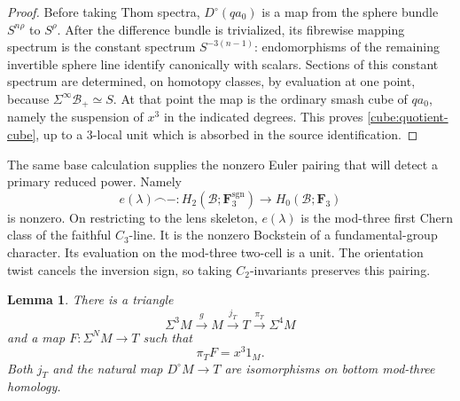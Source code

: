 \documentclass[11pt]{article}
\newtheorem{lemma}[theorem]{Lemma}
\theoremstyle{definition}
\theoremstyle{remark}
\numberwithin{equation}{section}
\begin{document}
\begin{proof}
Before taking Thom spectra, \(D^\circ(qa_0)\) is a map
from the sphere bundle \(S^{n\rho}\) to \(S^\rho\).
After the difference bundle is trivialized, its fibrewise
mapping spectrum is the constant spectrum
\(S^{-3(n-1)}\): endomorphisms of the remaining invertible
sphere line identify canonically with scalars.
Sections of this constant spectrum are determined, on
homotopy classes, by evaluation at one point, because
\(\Sigma^\infty\mathcal B_+\simeq S\).
At that point the map is the ordinary smash cube of \(qa_0\),
namely the suspension of \(x^3\) in the indicated degrees.
This proves \eqref{cube:quotient-cube}, up to a 3-local unit
which is absorbed in the source identification.
\end{proof}

The same base calculation supplies the nonzero Euler pairing
that will detect a primary reduced power.  Namely
\begin{equation}\label{cube:euler-pairing}
 e(\lambda)\frown-:
 H_2(\mathcal B;\mathbf F_3^{\mathrm{sgn}})
 \longrightarrow H_0(\mathcal B;\mathbf F_3)
\end{equation}
is nonzero.  On restricting to the lens skeleton, \(e(\lambda)\)
is the mod-three first Chern class of the faithful \(C_3\)-line.
It is the nonzero Bockstein of a fundamental-group character.
Its evaluation on the mod-three two-cell is a unit.  The
orientation twist cancels the inversion sign, so taking
\(C_2\)-invariants preserves this pairing.

\begin{lemma}\label{cube:attachment}
There is a triangle
\begin{equation}\label{cube:T-triangle}
 \Sigma^3M\xrightarrow{g}M\xrightarrow{j_T}T
      \xrightarrow{\pi_T}\Sigma^4M
\end{equation}
and a map \(F:\Sigma^NM\to T\) such that
\[
 \pi_TF=x^3 1_M.
\]
Both \(j_T\) and the natural map \(D^\circ M\to T\) are
isomorphisms on bottom mod-three homology.
\end{lemma}
\end{document}
